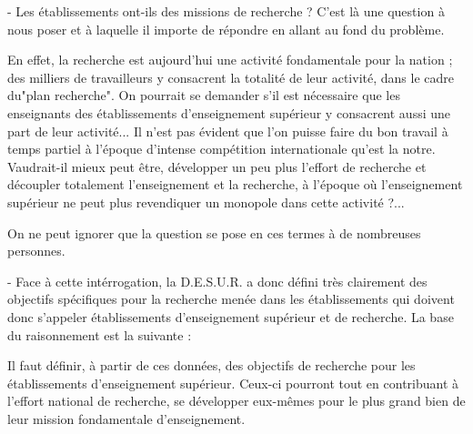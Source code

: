 - Les établissements ont-ils des missions de recherche ? C'est là une question à nous poser et à laquelle il importe de répondre en allant au fond du problème.

En effet, la recherche est aujourd'hui une activité fondamentale pour la nation ; des milliers de travailleurs y consacrent la totalité de leur activité, dans le cadre du"plan recherche". On pourrait se demander s'il est nécessaire que les enseignants des établissements d'enseignement supérieur y consacrent aussi une part de leur activité... Il n'est pas évident que l'on puisse faire du bon travail à temps partiel à l'époque d'intense compétition internationale qu'est la notre. Vaudrait-il mieux peut être, développer un peu plus l'effort de recherche et découpler totalement l'enseignement et la recherche, à l'époque où l'enseignement supérieur ne peut plus revendiquer un monopole dans cette activité ?...

On ne peut ignorer que la question se pose en ces termes à de nombreuses personnes. \unsure{-}

- Face à cette intérrogation, la D.E.S.U.R. a donc défini très clairement des objectifs spécifiques pour la recherche menée dans les établissements qui doivent donc s'appeler établissements d'enseignement supérieur et de recherche. La base du raisonnement est la suivante :

\noindent{}

Il faut définir, à partir de ces données, des objectifs de recherche pour les établissements d'enseignement supérieur. Ceux-ci pourront tout en contribuant à l'effort national de recherche, se développer eux-mêmes pour le plus grand bien de leur mission fondamentale d'enseignement.



